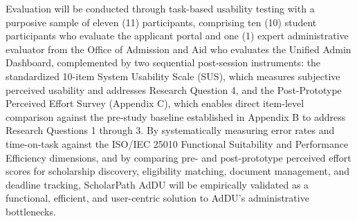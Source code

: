  Evaluation will be conducted through task-based usability testing with a purposive sample of eleven (11) participants, comprising ten (10) student participants who evaluate the applicant portal and one (1) expert administrative evaluator from the Office of Admission and Aid who evaluates the Unified Admin Dashboard, complemented by two sequential post-session instruments: the standardized 10-item System Usability Scale (SUS), which measures subjective perceived usability and addresses Research Question 4, and the Post-Prototype Perceived Effort Survey (Appendix C), which enables direct item-level comparison against the pre-study baseline established in Appendix B to address Research Questions 1 through 3. By systematically measuring error rates and time-on-task against the ISO/IEC 25010 Functional Suitability and Performance Efficiency dimensions, and by comparing pre- and post-prototype perceived effort scores for scholarship discovery, eligibility matching, document management, and deadline tracking, ScholarPath AdDU will be empirically validated as a functional, efficient, and user-centric solution to AdDU's administrative bottlenecks.
